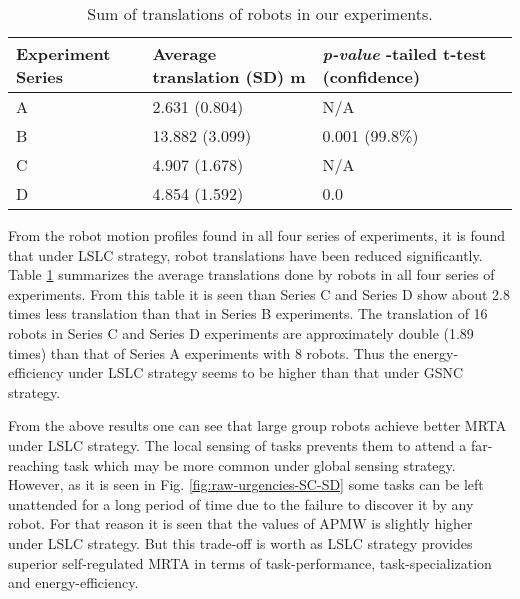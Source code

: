 \begin{table}[H]
\begin{center}
\caption{Sum of translations of robots in our experiments.}
\begin{tabular}{|p{0.8in}|m{1in}|m{0.9in}|}
\hline Experiment \protect\newline Series & Average \protect\newline translation \protect\newline(SD) m & \textit{p-value} \protect\newline 1-tailed t-test (confidence)\\ 
\hline A & 2.631 (0.804) & N/A\\ 
\hline B & 13.882 (3.099) & 0.001 (99.8\%)\\
\hline C & 4.907 (1.678) & N/A\\
\hline D  & 4.854  (1.592) & 0.0\\
\hline
\end{tabular}
\label{table:motion-cmp} 
\end{center}
\end{table}
From the robot motion profiles found in all four series of experiments,  it is found that under LSLC strategy, robot translations have been reduced significantly. Table \ref{table:motion-cmp} summarizes the average translations done by robots in all four series of experiments. From this table it is seen than Series C and Series D show about 2.8 times less translation than that in Series B experiments. The translation of 16 robots in Series C and Series D experiments are approximately double (1.89 times) than that of Series A experiments with 8 robots.  Thus the energy-efficiency under LSLC strategy seems to be higher  than that under GSNC strategy.

From the above results one can see that large group robots achieve better MRTA under LSLC strategy. The local sensing of tasks prevents them to attend a far-reaching task which may be more common under global sensing strategy. However, as it is seen in Fig. \ref{fig:raw-urgencies-SC-SD}
some tasks can be left unattended for a long period of time due to the failure to discover it by any robot. For that reason it is seen that the values of APMW is slightly higher under LSLC strategy. But this trade-off is worth as LSLC strategy provides superior self-regulated MRTA in terms of task-performance, task-specialization and energy-efficiency.
